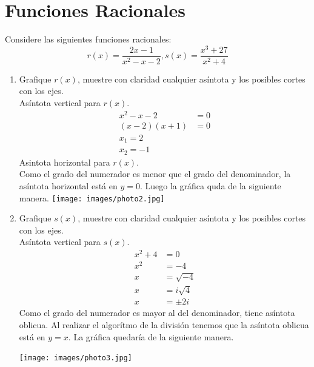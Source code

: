\documentclass{report}
\begin{document}
        \section*{Funciones Racionales}
            Considere las siguientes funciones racionales:
            $$ r(x) = \frac{2x-1}{x^2-x-2}, s(x) = \frac{x^3+27}{x^2+4} $$

            \begin{enumerate}
                \item Grafique $r(x)$, muestre con claridad cualquier asíntota y los posibles cortes con los ejes. \\
                    Asíntota vertical para $r(x)$.
                    \begin{align*}
                        x^2-x-2&= 0 \\
                        (x-2)(x+1)&= 0\\
                        x_1 = 2\\
                        x_2 = -1
                    \end{align*}
                    Asintota horizontal para $r(x)$.\\
                    Como el grado del numerador es menor que el grado del denominador, la asíntota horizontal está en $y = 0$. Luego la gráfica quda de la siguiente manera.
                    \texttt{[image: images/photo2.jpg]}
                \item Grafique $s(x)$, muestre con claridad cualquier asíntota y los posibles cortes con los ejes. \\
                    Asíntota vertical para $s(x)$.
                    \begin{align*}
                        x^2+4&= 0 \\
                        x^2&=-4\\
                        x &= \sqrt{-4}\\
                        x &= i\sqrt{4}\\
                        x &= \pm 2i
                    \end{align*}
                    Como el grado del numerador es mayor al del denominador, tiene asíntota oblicua.
                    Al realizar el algorítmo de la división tenemos que la asíntota oblicua está en $y=x$. La gráfica quedaría de la siguiente manera.

                    \texttt{[image: images/photo3.jpg]}
            \end{enumerate}
\end{document}
